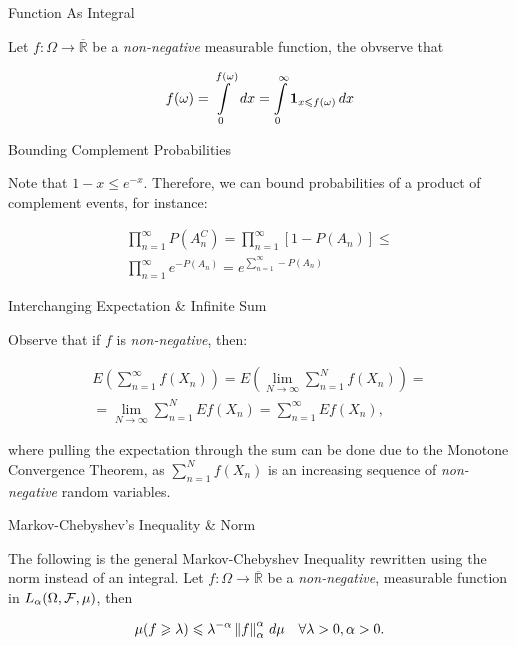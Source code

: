 \begin{observation}{}{Function As Integral}

    Let $f: \Omega \to \overline{\mathbb{R}}$ be a \emph{non-negative} measurable function, the obvserve that

        \begin{align*}
            f(\omega) = \int\limits_0^{f(\omega)} \, dx = \int\limits_0^{\infty} \mathbf{1}_{x \leqslant f(\omega)} \, dx
        \end{align*}

\end{observation}

\begin{observation}{}{Bounding Complement Probabilities}

    Note that $1 - x \leq e^{-x}$. Therefore, we can bound probabilities of a product of complement events, for instance:

        \begin{align*}
            \prod_{n = 1}^{\infty} P(A_n^C) = \prod_{n = 1}^{\infty} [1 - P(A_n)] \leq \\ \prod_{n = 1}^{\infty} e^{-P(A_n)} = e^{\sum_{n = 1}^{\infty} -P(A_n)}
        \end{align*}

\end{observation}

\begin{observation}{}{Interchanging Expectation \& Infinite Sum}

    Observe that if $f$ is \emph{non-negative}, then:

        \begin{align*}
            E\left(\sum_{n=1}^{\infty} f(X_n)\right) = 
            E\left(\lim_{N \to \infty} \sum_{n=1}^{N} f(X_n)\right) = \\
            = \lim_{N \to \infty} \sum_{n=1}^{N} E f(X_n) = 
            \sum_{n=1}^{\infty} E f(X_n),
        \end{align*}

    where pulling the expectation through the sum can be done due to the Monotone Convergence Theorem, as $\sum_{n=1}^{N} f(X_n)$ is an increasing sequence of \emph{non-negative} random variables.

\end{observation}

\begin{observation}{}{Markov-Chebyshev's Inequality \& Norm}

    The following is the general Markov-Chebyshev Inequality rewritten using the norm instead of an integral. Let $f: \Omega \to \overline{\mathbb{R}}$ be a \emph{non-negative}, measurable function in $L_{\alpha}(\Omega, \mathcal{F}, \mu)$, then

        \begin{align*}
            \mu(f \geq \lambda) \leq \lambda^{-\alpha} \Norm{f}_{\alpha}^{\alpha} \, d\mu \quad \forall \lambda > 0, \alpha > 0.
        \end{align*}

\end{observation}


